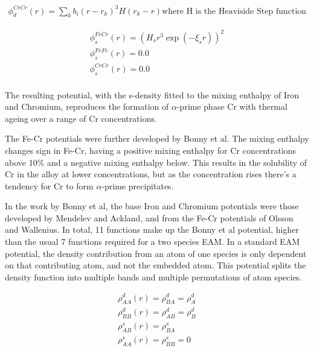 \begin{equation}
\begin{split}
\phi_{d}^{CrCr}(r) = \sum_k b_i (r-r_k)^3 H(r_k - r) \text{where H is the Heaviside Step function}
\end{split}
\label{eq:olssonembedding}
\end{equation}

\begin{equation}
\begin{split}
\phi_s^{FeCr} (r) = (H_s r^3 \exp(-\xi_s r))^2 \\
\phi_s^{FeFe} (r) = 0.0 \\
\phi_s^{CrCr} (r) = 0.0 \\
\end{split}
\label{eq:olssonembedding}
\end{equation}

The resulting potential, with the s-density fitted to the mixing enthalpy of Iron and Chromium, reproduces the formation of $\alpha$-prime phase Cr with thermal ageing over a range of Cr concentrations.

The Fe-Cr potentials were further developed by Bonny et al.  The mixing enthalpy changes sign in Fe-Cr, having a positive mixing \gls{enthalpy} for Cr concentrations above 10\% and a negative mixing \gls{enthalpy} below.  This results in the solubility of Cr in the alloy at lower concentrations, but as the concentration rises there's a tendency for Cr to form $\alpha$-prime precipitates\cite{bonnyfecr}.

In the work by Bonny et al, the base Iron and Chromium potentials were those developed by Mendelev and Ackland, and from the Fe-Cr potentials of Olsson and Wallenius.  In total, 11 functions make up the Bonny et al potential, higher than the usual 7 functions required for a two species EAM.  In a standard EAM potential, the density contribution from an atom of one species is only dependent on that contributing atom, and not the embedded atom.  This potential splits the density function into multiple bands and multiple permutations of atom species.

\begin{equation}
\begin{split}
\rho_{AA}^{d} (r) = \rho_{BA}^{d} = \rho_{A}^{d} \\
\rho_{BB}^{d} (r) = \rho_{AB}^{d} = \rho_{B}^{d} \\
\rho_{AB}^{s} (r) = \rho_{BA}^{s} \\
\rho_{AA}^{s} (r) = \rho_{BB}^{s} = 0 \\
\end{split}
\label{eq:densityfunctions}
\end{equation}

